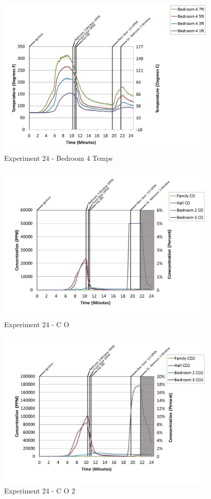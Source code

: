 \documentclass{article}
\begin{document}
\begin{appendices}
	\clearpage

	\begin{figure}[h!]
		\centering
		\includegraphics[height=3.05in]{0_Images/Results_Charts/Exp_24_Charts/Bedroom4Temps.pdf}
		\caption{Experiment 24 - Bedroom 4 Temps}
	\end{figure}
 

	\begin{figure}[h!]
		\centering
		\includegraphics[height=3.05in]{0_Images/Results_Charts/Exp_24_Charts/CO.pdf}
		\caption{Experiment 24 - C O}
	\end{figure}
 
	\clearpage

	\begin{figure}[h!]
		\centering
		\includegraphics[height=3.05in]{0_Images/Results_Charts/Exp_24_Charts/CO2.pdf}
		\caption{Experiment 24 - C O 2}
	\end{figure}
 


\end{appendices}
\end{document}
